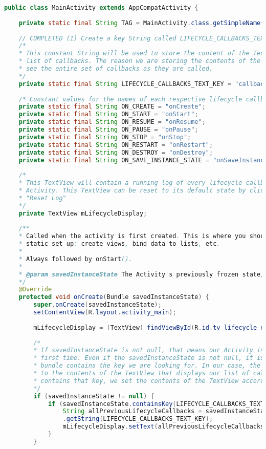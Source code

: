 \documentclass[12pt]{article} %
\begin{document}
\begin{lstlisting}[language=Java]
public class MainActivity extends AppCompatActivity {
	
	private static final String TAG = MainActivity.class.getSimpleName();
	
	// COMPLETED (1) Create a key String called LIFECYCLE_CALLBACKS_TEXT_KEY
	/*
	* This constant String will be used to store the content of the TextView used to display the
	* list of callbacks. The reason we are storing the contents of the TextView is so that you can
	* see the entire set of callbacks as they are called.
	*/
	private static final String LIFECYCLE_CALLBACKS_TEXT_KEY = "callbacks";
	
	/* Constant values for the names of each respective lifecycle callback */
	private static final String ON_CREATE = "onCreate";
	private static final String ON_START = "onStart";
	private static final String ON_RESUME = "onResume";
	private static final String ON_PAUSE = "onPause";
	private static final String ON_STOP = "onStop";
	private static final String ON_RESTART = "onRestart";
	private static final String ON_DESTROY = "onDestroy";
	private static final String ON_SAVE_INSTANCE_STATE = "onSaveInstanceState";
	
	/*
	* This TextView will contain a running log of every lifecycle callback method called from this
	* Activity. This TextView can be reset to its default state by clicking the Button labeled
	* "Reset Log"
	*/
	private TextView mLifecycleDisplay;
	
	/**
	* Called when the activity is first created. This is where you should do all of your normal
	* static set up: create views, bind data to lists, etc.
	*
	* Always followed by onStart().
	*
	* @param savedInstanceState The Activity's previously frozen state, if there was one.
	*/
	@Override
	protected void onCreate(Bundle savedInstanceState) {
		super.onCreate(savedInstanceState);
		setContentView(R.layout.activity_main);
		
		mLifecycleDisplay = (TextView) findViewById(R.id.tv_lifecycle_events_display);
		
		/*
		* If savedInstanceState is not null, that means our Activity is not being started for the
		* first time. Even if the savedInstanceState is not null, it is smart to check if the
		* bundle contains the key we are looking for. In our case, the key we are looking for maps
		* to the contents of the TextView that displays our list of callbacks. If the bundle
		* contains that key, we set the contents of the TextView accordingly.
		*/
		if (savedInstanceState != null) {
			if (savedInstanceState.containsKey(LIFECYCLE_CALLBACKS_TEXT_KEY)) {
				String allPreviousLifecycleCallbacks = savedInstanceState
				.getString(LIFECYCLE_CALLBACKS_TEXT_KEY);
				mLifecycleDisplay.setText(allPreviousLifecycleCallbacks);
			}
		}
		

\end{lstlisting}
\end{document}
